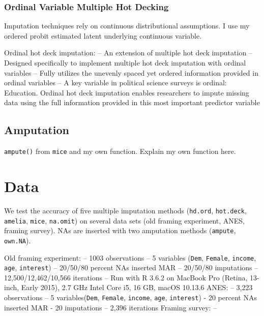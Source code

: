 \documentclass[12pt,econ]{sources/authesis}
\begin{document}
\hypertarget{ordmiss-theory-multimpute-hdord}{%
\subsubsection{Ordinal Variable Multiple Hot Decking}\label{ordmiss-theory-multimpute-hdord}}

Imputation techniques rely on continuous distributional assumptions.
I use my ordered probit estimated latent underlying continuous variable.

Ordinal hot deck imputation:
-- An extension of multiple hot deck imputation
-- Designed specifically to implement multiple hot deck imputation with ordinal variables
-- Fully utilizes the unevenly spaced yet ordered information provided in ordinal variables
-- A key variable in political science surveys is ordinal: Education. Ordinal hot deck imputation enables researchers to impute missing data using the full information provided in this most important predictor variable

\hypertarget{ordmiss-theory-ampute}{%
\subsection{Amputation}\label{ordmiss-theory-ampute}}

\texttt{ampute()} from \texttt{mice} and my own function. Explain my own function here.

\hypertarget{ordmiss-data}{%
\section{Data}\label{ordmiss-data}}

We test the accuracy of five multiple imputation methods (\texttt{hd.ord}, \texttt{hot.deck}, \texttt{amelia}, \texttt{mice}, \texttt{na.omit}) on several data sets (old framing experiment, ANES, framing survey). NAs are inserted with two amputation methods (\texttt{ampute}, \texttt{own.NA}).

Old framing experiment:
-- 1003 observations
-- 5 variables (\texttt{Dem}, \texttt{Female}, \texttt{income}, \texttt{age}, \texttt{interest})
-- 20/50/80 percent NAs inserted MAR
-- 20/50/80 imputations
-- 12,500/12,462/10,566 iterations
-- Run with R 3.6.2 on MacBook Pro (Retina, 13-inch, Early 2015), 2.7 GHz Intel Core i5, 16 GB, macOS 10.13.6
ANES:
-- 3,223 observations
-- 5 variables(\texttt{Dem}, \texttt{Female}, \texttt{income}, \texttt{age}, \texttt{interest})
- 20 percent NAs inserted MAR
- 20 imputations
-- 2,396 iterations
Framing survey:
--
\end{document}
